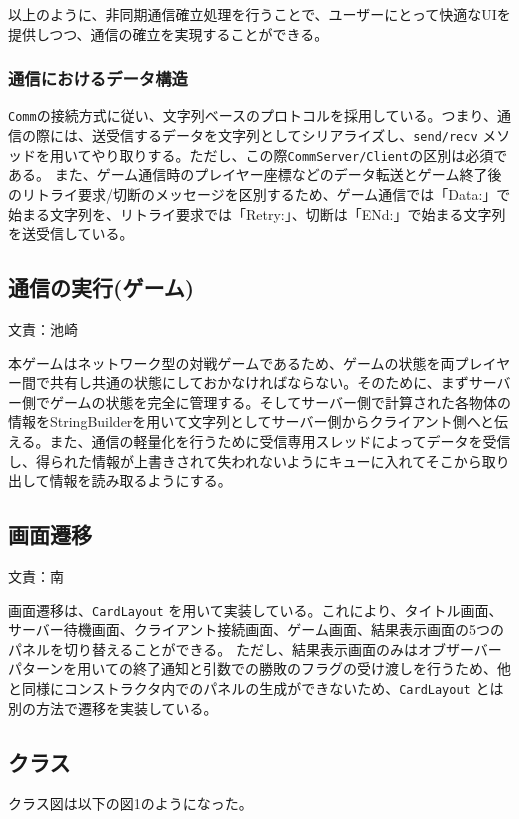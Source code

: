 \documentclass[11pt,a4j]{jarticle}
\begin{document}
以上のように、非同期通信確立処理を行うことで、ユーザーにとって快適なUIを提供しつつ、通信の確立を実現することができる。

\subsubsection{通信におけるデータ構造}
\texttt{Comm}の接続方式に従い、文字列ベースのプロトコルを採用している。つまり、通信の際には、送受信するデータを文字列としてシリアライズし、\texttt{send/recv} メソッドを用いてやり取りする。ただし、この際\texttt{CommServer/Client}の区別は必須である。
また、ゲーム通信時のプレイヤー座標などのデータ転送とゲーム終了後のリトライ要求/切断のメッセージを区別するため、ゲーム通信では「Data:」で始まる文字列を、リトライ要求では「Retry:」、切断は「ENd:」で始まる文字列を送受信している。

\subsection{通信の実行(ゲーム)}
\begin{flushright}
  文責：池崎
\end{flushright}
本ゲームはネットワーク型の対戦ゲームであるため、ゲームの状態を両プレイヤー間で共有し共通の状態にしておかなければならない。そのために、まずサーバー側でゲームの状態を完全に管理する。そしてサーバー側で計算された各物体の情報をStringBuilderを用いて文字列としてサーバー側からクライアント側へと伝える。また、通信の軽量化を行うために受信専用スレッドによってデータを受信し、得られた情報が上書きされて失われないようにキューに入れてそこから取り出して情報を読み取るようにする。

\subsection{画面遷移}
\begin{flushright}
  文責：南
\end{flushright}
画面遷移は、\texttt{CardLayout} を用いて実装している。これにより、タイトル画面、サーバー待機画面、クライアント接続画面、ゲーム画面、結果表示画面の5つのパネルを切り替えることができる。
ただし、結果表示画面のみはオブザーバーパターンを用いての終了通知と引数での勝敗のフラグの受け渡しを行うため、他と同様にコンストラクタ内でのパネルの生成ができないため、\texttt{CardLayout} とは別の方法で遷移を実装している。








\subsection{クラス}
クラス図は以下の図1のようになった。
\end{document}
